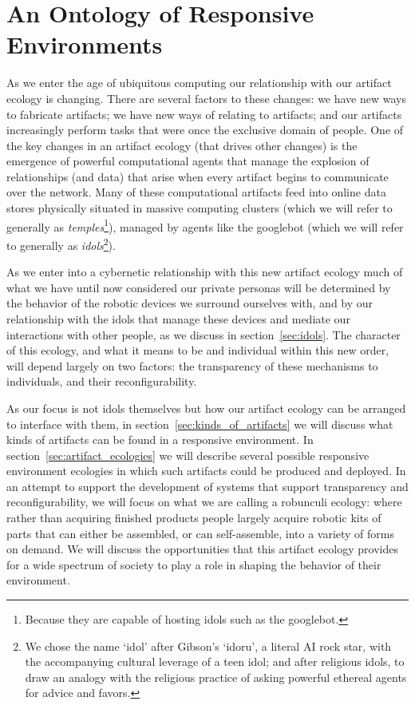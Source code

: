 \chapter{An Ontology of Responsive Environments}
\label{ch:ontology}
%
As we enter the age of ubiquitous computing \citep{weiser_1999} our relationship with our artifact ecology is changing. 
There are several factors to these changes: we have new ways to fabricate artifacts; we have new ways of relating to artifacts; and our artifacts increasingly perform tasks that were once the exclusive domain of people.
One of the key changes in an artifact ecology (that drives other changes) is the emergence of powerful computational agents that manage the explosion of relationships (and data) that arise when every artifact begins to communicate over the network.
Many of these computational artifacts feed into online data stores physically situated in massive computing clusters (which we will refer to generally as \emph{temples}\footnote{Because they are capable of hosting idols such as the googlebot.}), managed by agents like the googlebot (which we will refer to generally as \emph{idols}\footnote{We chose the name `idol' after Gibson's `idoru'\citeyearpar{gibson_idoru}, a literal AI rock star, with the accompanying cultural leverage of a teen idol; and after religious idols, to draw an analogy with the religious practice of asking powerful ethereal agents for advice and favors.}).

As we enter into a cybernetic relationship with this new artifact ecology much of what we have until now considered our private personas will be determined by the behavior of the robotic devices we surround ourselves with, and by our relationship with the idols that manage these devices and mediate our interactions with other people, as we discuss in section~\ref{sec:idols}.
The character of this ecology, and what it means to be and individual within this new order, will depend largely on two factors: the transparency of these mechanisms to individuals, and their reconfigurability.

As our focus is not idols themselves but how our artifact ecology can be arranged to interface with them, in section~\ref{sec:kinds_of_artifacts} we will discuss what kinds of artifacts can be found in a responsive environment.
In section~\ref{sec:artifact_ecologies} we will describe several possible responsive environment ecologies in which such artifacts could be produced and deployed. 
In an attempt to support the development of systems that support transparency and reconfigurability, we will focus on what we are calling a robunculi ecology: where rather than acquiring finished products people largely acquire robotic kits of parts that can either be assembled, or can self-assemble, into a variety of forms on demand. 
We will discuss the opportunities that this artifact ecology provides for a wide spectrum of society to play a role in shaping the behavior of their environment. 

